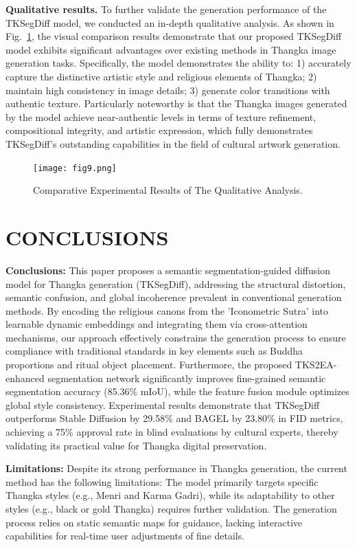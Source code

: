 \documentclass[sn-mathphys]{sn-jnl}%
\theoremstyle{thmstyleone}%
\theoremstyle{thmstyletwo}%
\theoremstyle{thmstylethree}%
\begin{document}
\textbf{Qualitative results.} To further validate the generation performance of the TKSegDiff model, we conducted an in-depth qualitative analysis. As shown in Fig.~\ref{fig9}, the visual comparison results demonstrate that our proposed TKSegDiff model exhibits significant advantages over existing methods in Thangka image generation tasks. Specifically, the model demonstrates the ability to: 1) accurately capture the distinctive artistic style and religious elements of Thangka; 2) maintain high consistency in image details; 3) generate color transitions with authentic texture. Particularly noteworthy is that the Thangka images generated by the model achieve near-authentic levels in terms of texture refinement, compositional integrity, and artistic expression, which fully demonstrates TKSegDiff's outstanding capabilities in the field of cultural artwork generation.
\begin{figure}[htbp]
	\centerline{\texttt{[image: fig9.png]}}
	\caption{Comparative Experimental Results of The Qualitative Analysis.}
	\label{fig9}
\end{figure}
\section{CONCLUSIONS}
\textbf{Conclusions:} This paper proposes a semantic segmentation-guided diffusion model for Thangka generation (TKSegDiff), addressing the structural distortion, semantic confusion, and global incoherence prevalent in conventional generation methods. By encoding the religious canons from the 'Iconometric Sutra' into learnable dynamic embeddings and integrating them via cross-attention mechanisms, our approach effectively constrains the generation process to ensure compliance with traditional standards in key elements such as Buddha proportions and ritual object placement. Furthermore, the proposed TKS2EA-enhanced segmentation network significantly improves fine-grained semantic segmentation accuracy (85.36\% mIoU), while the feature fusion module optimizes global style consistency. Experimental results demonstrate that TKSegDiff outperforms Stable Diffusion by 29.58\% and BAGEL by 23.80\% in FID metrics, achieving a 75\% approval rate in blind evaluations by cultural experts, thereby validating its practical value for Thangka digital preservation.

\textbf{Limitations:} Despite its strong performance in Thangka generation, the current method has the following limitations: The model primarily targets specific Thangka styles (e.g., Menri and Karma Gadri), while its adaptability to other styles (e.g., black or gold Thangka) requires further validation. The generation process relies on static semantic maps for guidance, lacking interactive capabilities for real-time user adjustments of fine details.
\end{document}
